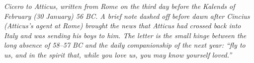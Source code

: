 
\textit{Cicero to Atticus, written from Rome on the third day
before the Kalends of February (30 January) 56 BC. A brief
note dashed off before dawn after Cincius (Atticus's agent at
Rome) brought the news that Atticus had crossed back into
Italy and was sending his boys to him. The letter is the small
hinge between the long absence of 58--57 BC and the daily
companionship of the next year: ``fly to us, and in the spirit
that, while you love us, you may know yourself loved.''}
